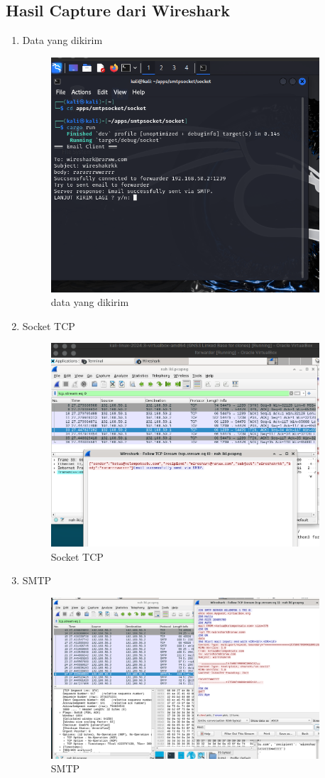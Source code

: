 \documentclass[12pt, a4paper]{article}
\begin{document}
\subsection{Hasil Capture dari Wireshark}
\begin{enumerate}
\item Data yang dikirim
\begin{figure}[!ht]
    \centering
    \includegraphics[width=10cm]{bab 3/data.png}
    \caption{data yang dikirim}
\end{figure}
\clearpage
\item Socket TCP
\begin{figure}[!ht]
    \centering
    \includegraphics[width=10cm]{bab 3/tcp0.png}
    \caption{Socket TCP}
\end{figure}
\item SMTP  
 \begin{figure}[h]
    \centering
    \includegraphics[width=10cm]{bab 3/tcp1.png}
    \caption{SMTP}
  \end{figure}
\end{enumerate}
\pagebreak
\end{document}
